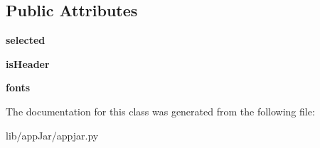 \subsection*{Public Attributes}
\begin{DoxyCompactItemize}
\item 
\mbox{\label{classappjar_1_1_grid_cell_a1fab273772a4dfb99179dbd4c8c476af}} 
{\bfseries selected}
\item 
\mbox{\label{classappjar_1_1_grid_cell_a283f02d8fb5c464bb98e0f2f4c71d086}} 
{\bfseries is\+Header}
\item 
\mbox{\label{classappjar_1_1_grid_cell_a7963cbf09d38bba7e627f634cd018c3c}} 
{\bfseries fonts}
\end{DoxyCompactItemize}


The documentation for this class was generated from the following file\+:\begin{DoxyCompactItemize}
\item 
lib/app\+Jar/appjar.\+py\end{DoxyCompactItemize}
